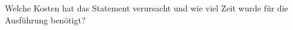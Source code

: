    \item Welche Kosten hat das Statement verursacht und wie viel Zeit wurde f\"ur die Ausf\"uhrung ben\"otigt?
